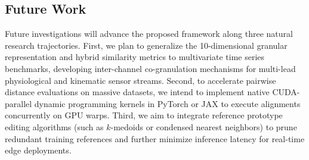 \documentclass[conference]{IEEEtran}
\begin{document}
\subsection{Future Work}
Future investigations will advance the proposed framework along three natural research trajectories. First, we plan to generalize the 10-dimensional granular representation and hybrid similarity metrics to multivariate time series benchmarks, developing inter-channel co-granulation mechanisms for multi-lead physiological and kinematic sensor streams. Second, to accelerate pairwise distance evaluations on massive datasets, we intend to implement native CUDA-parallel dynamic programming kernels in PyTorch or JAX to execute alignments concurrently on GPU warps. Third, we aim to integrate reference prototype editing algorithms (such as $k$-medoids or condensed nearest neighbors) to prune redundant training references and further minimize inference latency for real-time edge deployments.
\end{document}
